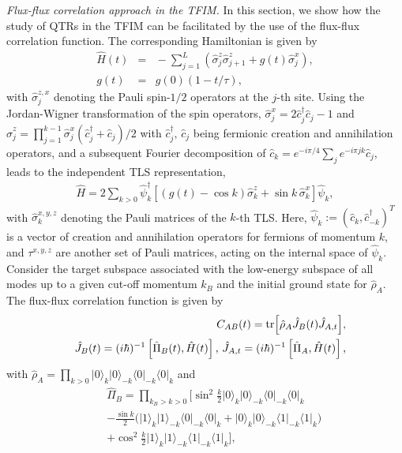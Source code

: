 \documentclass[prl,aps,amssymb,twocolumn,superscriptaddress, notitlepage, longbibliography]{revtex4-2}
\begin{document}
{\it Flux-flux correlation approach in the TFIM.} In this section, we show how the study of QTRs in the TFIM can be facilitated by the use of the flux-flux correlation function. The corresponding Hamiltonian is given by~\cite{Zurek2005Dynamics,Dziarmaga2005Dynamics,Suzuki2012Quantum,Sachdev2011Quantum}
\begin{eqnarray}
    \hat{H}(t)\!&=&\!-\!\sum_{j=1}^L \left( \hat{\sigma}^z_j \hat{\sigma}^z_{j+1} + g(t) \hat{\sigma}_j^x \right),\\g(t)\!&=&\!g(0)(1-t/\tau),\quad\quad
\end{eqnarray}
with $\hat\sigma^{z,x}_j$ denoting the Pauli spin-$1/2$ operators at the $j$-th site.
Using the Jordan-Wigner transformation of the spin operators, $\hat\sigma^x_j=2\hat c^\dagger_j\hat c_j-1$ and $\hat\sigma^z_j=\prod_{j=1}^{k-1}\hat\sigma^x_j(\hat c^\dagger_j+\hat c_j)/2$ with $\hat c^\dagger_j,\,\hat c_j$ being fermionic creation and annihilation operators, and a subsequent Fourier decomposition of $\hat c_k=e^{-i\pi /4}\sum_j e^{-i\pi jk}\hat c_j$, leads to the independent TLS representation,
\begin{eqnarray}
    \hat{H}
    = 2 \sum_{k>0} \hat{\psi}_k^\dagger \left[ (g(t)-\cos k)\hat \sigma^z_k + \sin k \, \hat \sigma^x_k \right] \hat{\psi}_k,
\end{eqnarray}
with $\hat \sigma^{x,y,z}_k$ denoting the Pauli matrices of the $k$-th TLS.
Here, $\hat{\psi}_k := (\hat{c}_k, \hat{c}_{-k}^\dagger)^T$ is a vector of creation and annihilation operators for fermions of momentum $k$, and $\tau^{x,y,z}$ are another set of Pauli matrices, acting on the internal space of $\hat{\psi}_k$. Consider the target subspace associated with the low-energy subspace of all modes up to a given cut-off momentum $k_B$ and the initial ground state for $\hat\rho_A$. The flux-flux correlation function is given by~\cite{Zurek2005Dynamics,Dziarmaga2005Dynamics,Suzuki2012Quantum,Sachdev2011Quantum}
\begin{eqnarray}
    &&C_{AB}(t)=\tr[\hat\rho_A\hat J_B(t)\hat J_{A,t}],\\
    &&\hat J_{B}(t)=(i\hbar)^{-1}\left[\hat\Pi_B(t),\hat H(t)\right],\,\hat J_{A,t}=(i\hbar)^{-1}\left[\hat\Pi_A,\hat H(t)\right],\nonumber
\end{eqnarray}
with $\hat\rho_A=\prod_{k>0}\lvert 0\rangle_{k}\lvert 0\rangle_{-k}\langle 0\rvert_{-k}\langle 0\rvert_{k}$ and
\begin{eqnarray}\label{eq: rho_A_Pi_B_t}
    &&\hat\Pi_B=\prod_{k_B>k>0}\big[\sin^2\frac{k}{2}\lvert0\rangle_k\lvert0\rangle_{-k}\langle0\rvert_{-k}\langle0\rvert_k\nonumber\\
    &&-\frac{\sin k}{2}\Big(\lvert1\rangle_k\lvert1\rangle_{-k}\langle0\rvert_{-k}\langle0\rvert_k+\lvert0\rangle_k\lvert0\rangle_{-k}\langle1\rvert_{-k}\langle1\rvert_k\Big)\nonumber\\
    &&+\cos^2\frac{k}{2}\lvert1\rangle_k\lvert1\rangle_{-k}\langle1\rvert_{-k}\langle1\rvert_k\Big],
\end{eqnarray}
\end{document}
